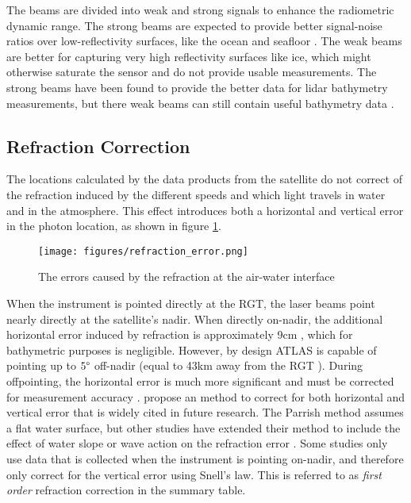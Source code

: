The beams are divided into weak and strong signals to enhance the radiometric dynamic range. The strong beams are expected to provide better signal-noise ratios over low-reflectivity surfaces, like the ocean and seafloor \parencite{Neumann2019d}. The weak beams are better for capturing very high reflectivity surfaces like ice, which might otherwise saturate the sensor and do not provide usable measurements. The strong beams have been found to provide the better data for lidar bathymetry measurements, but there weak beams can still contain useful bathymetry data \parencite{add citation}. 

\subsection{Refraction Correction}
The locations calculated by the data products from the satellite do not correct of the refraction induced by the different speeds and which light travels in water and in the atmosphere. This effect introduces both a horizontal and vertical error in the photon location, as shown in figure \ref{refract-image}.

\begin{figure}[ht]
      \centering
      \texttt{[image: figures/refraction\_error.png]}
      \caption{The errors caused by the refraction at the air-water interface}
      \label{refract-image}
\end{figure}

When the instrument is pointed directly at the RGT, the laser beams point nearly directly at the satellite's nadir. When directly on-nadir, the additional horizontal error induced by refraction is approximately 9cm \parencite{Parrish2019}, which for bathymetric purposes is negligible. However, by design ATLAS is capable of pointing up to $5 \degree$ off-nadir (equal to 43km away from the RGT \parencite{Magruder2021}). During offpointing, the horizontal error is much more significant and must be corrected for measurement accuracy \parencite{Parrish2019}.\citeauthor{Parrish2019} propose an method to correct for both horizontal and vertical error that is widely cited in future research. The Parrish method assumes a flat water surface, but other studies have extended their method to include the effect of water slope or wave action on the refraction error \parencite{Ma2020,Zhang2022}. Some studies only use data that is collected when the instrument is pointing on-nadir, and therefore only correct for the vertical error using Snell's law. This is referred to as \emph{first order} refraction correction in the summary table.

